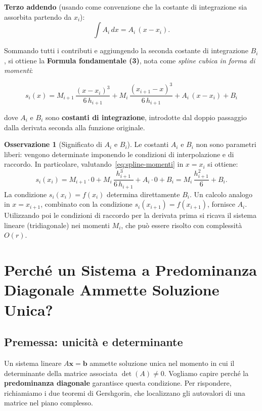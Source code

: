 \documentclass[a4paper,12pt]{article}
\theoremstyle{definition}
\newtheorem{osservazione}{Osservazione}[section]
\theoremstyle{remark}
\begin{document}
\noindent\textbf{Terzo addendo} (usando come convenzione che la costante
di integrazione sia assorbita partendo da $x_i$):
\[
  \int A_i\,dx = A_i\,(x - x_i).
\]

\noindent Sommando tutti i contributi e aggiungendo la seconda costante di
integrazione $B_i$, si ottiene la \textbf{Formula fondamentale (3)}, nota
come \emph{spline cubica in forma di momenti}:

\begin{equation}
  \boxed{
    s_i(x) = M_{i+1}\,\frac{(x - x_i)^3}{6\,h_{i+1}}
            + M_i\,\frac{(x_{i+1} - x)^3}{6\,h_{i+1}}
            + A_i\,(x - x_i) + B_i
  }
  \label{eq:spline-momenti}
\end{equation}

\noindent dove $A_i$ e $B_i$ sono \textbf{costanti di integrazione},
introdotte dal doppio passaggio dalla derivata seconda alla funzione
originale.

\begin{osservazione}[Significato di $A_i$ e $B_i$]
Le costanti $A_i$ e $B_i$ non sono parametri liberi: vengono determinate
imponendo le condizioni di interpolazione e di raccordo. In particolare,
valutando~\eqref{eq:spline-momenti} in $x = x_i$ si ottiene:
\[
  s_i(x_i) = M_{i+1}\cdot 0 + M_i\,\frac{h_{i+1}^3}{6\,h_{i+1}}
             + A_i\cdot 0 + B_i
           = M_i\,\frac{h_{i+1}^2}{6} + B_i.
\]
La condizione $s_i(x_i) = f(x_i)$ determina direttamente $B_i$. Un calcolo
analogo in $x = x_{i+1}$, combinato con la condizione $s_i(x_{i+1}) = f(x_{i+1})$,
fornisce $A_i$. Utilizzando poi le condizioni di raccordo per la derivata
prima si ricava il sistema lineare (tridiagonale) nei momenti $M_i$,
che può essere risolto con complessità $O(r)$.
\end{osservazione}


\section{Perché un Sistema a Predominanza Diagonale Ammette Soluzione Unica?}

\subsection{Premessa: unicità e determinante}

Un sistema lineare $A\mathbf{x} = \mathbf{b}$ ammette soluzione unica nel momento in cui il
determinante della matrice associata $\det(A) \neq 0$. Vogliamo capire perché la
\textbf{predominanza diagonale} garantisce questa condizione. Per rispondere, richiamiamo i
due teoremi di Gershgorin, che localizzano gli autovalori di una matrice nel piano complesso.
\end{document}
